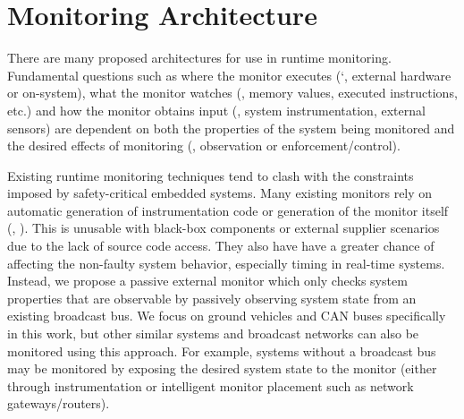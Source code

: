 
\section{Monitoring Architecture}
There are many proposed architectures for use in runtime monitoring. Fundamental questions such as where the monitor executes (\eg`, external hardware or on-system), what the monitor watches (\eg, memory values, executed instructions, etc.) and how the monitor obtains input (\eg, system instrumentation, external sensors) are dependent on both the properties of the system being monitored and the desired effects of monitoring (\ie, observation or enforcement/control).  

Existing runtime monitoring techniques tend to clash with the constraints imposed by safety-critical embedded systems. 
Many existing monitors rely on automatic generation of instrumentation code or generation of the monitor itself (\eg, \cite{Havelund2004, Pike2011}).
This is unusable with black-box components or external supplier scenarios due to the lack of source code access. They also have have a greater chance of affecting the non-faulty system behavior, especially timing in real-time systems.
Instead, we propose a passive external monitor which only checks system properties that are observable by passively observing system state from an existing broadcast bus.
We focus on ground vehicles and CAN buses specifically in this work, but other similar systems and broadcast networks can also be monitored using this approach.
For example, systems without a broadcast bus may be monitored by exposing the desired system state to the monitor (either through instrumentation or intelligent monitor placement such as network gateways/routers).

